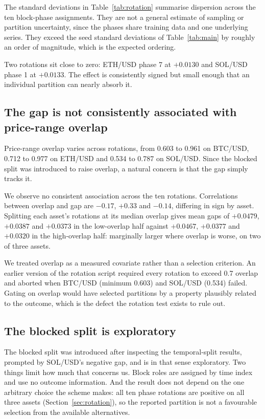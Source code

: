 \documentclass[11pt]{article}
\begin{document}
The standard deviations in Table~\ref{tab:rotation} summarise dispersion
across the ten block-phase assignments. They are not a general estimate of
sampling or partition uncertainty, since the phases share training data and one
underlying series. They exceed the seed standard deviations of
Table~\ref{tab:main} by roughly an order of magnitude, which is the expected
ordering.

Two rotations sit close to zero: ETH/USD phase 7 at $+0.0130$ and SOL/USD phase
1 at $+0.0133$. The effect is consistently signed but small enough that an
individual partition can nearly absorb it.

\subsection{The gap is not consistently associated with price-range overlap}
\label{sec:overlap-covariate}

Price-range overlap varies across rotations, from 0.603 to 0.961 on BTC/USD,
0.712 to 0.977 on ETH/USD and 0.534 to 0.787 on SOL/USD. Since the blocked
split was introduced to raise overlap, a natural concern is that the gap simply
tracks it.

We observe no consistent association across the ten rotations. Correlations
between overlap and gap are $-0.17$, $+0.33$ and $-0.14$, differing in sign by
asset. Splitting each asset's
rotations at its median overlap gives mean gaps of $+0.0479$, $+0.0387$ and
$+0.0373$ in the low-overlap half against $+0.0467$, $+0.0377$ and $+0.0320$ in
the high-overlap half: marginally larger where overlap is worse, on two of three
assets.

We treated overlap as a measured covariate rather than a selection criterion.
An earlier version of the rotation script required every rotation to exceed 0.7
overlap and aborted when BTC/USD (minimum 0.603) and SOL/USD (0.534) failed.
Gating on overlap would have selected partitions by a property plausibly
related to the outcome, which is the defect the rotation test exists to rule
out.

\subsection{The blocked split is exploratory}

The blocked split was introduced after inspecting the temporal-split results,
prompted by SOL/USD's negative gap, and is in that sense exploratory. Two
things limit how much that concerns us. Block roles are assigned by time index
and use no outcome information. And the result does not depend on the one
arbitrary choice the scheme makes: all ten phase rotations are positive on all
three assets (Section~\ref{sec:rotation}), so the reported partition is not a
favourable selection from the available alternatives.
\end{document}
